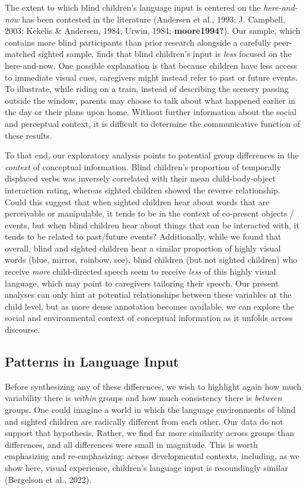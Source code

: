 \documentclass[
  man,floatsintext]{apa6}
\begin{document}
The extent to which blind children's language input is centered on the \emph{here-and-now} has been contested in the literature (Andersen et al., 1993; J. Campbell, 2003; Kekelis \& Andersen, 1984; Urwin, 1984; \textbf{moore1994?}). Our sample, which contains more blind participants than prior research alongside a carefully peer-matched sighted sample, finds that blind children's input is \emph{less} focused on the here-and-now. One possible explanation is that because children have less access to immediate visual cues, caregivers might instead refer to past or future events. To illustrate, while riding on a train, instead of describing the scenery passing outside the window, parents may choose to talk about what happened earlier in the day or their plans upon home. Without further information about the social and perceptual context, it is difficult to determine the communicative function of these results.

To that end, our exploratory analysis points to potential group differences in the \emph{context} of conceptual information. Blind children's proportion of temporally displaced verbs was inversely correlated with their mean child-body-object interaction rating, whereas sighted children showed the reverse relationship. Could this suggest that when sighted children hear about words that are perceivable or manipulable, it tends to be in the context of co-present objects / events, but when blind children hear about things that can be interacted with, it tends to be related to past/future events? Additionally, while we found that overall, blind and sighted children hear a similar proportion of highly visual words (blue, mirror, rainbow, see), blind children (but not sighted children) who receive \emph{more} child-directed speech seem to receive \emph{less} of this highly visual language, which may point to caregivers tailoring their speech. Our present analyses can only hint at potential relationships between these variables at the child level, but as more dense annotation becomes available, we can explore the social and environmental context of conceptual information as it unfolds across discourse.

\hypertarget{patterns-in-language-input}{%
\subsection{Patterns in Language Input}\label{patterns-in-language-input}}

Before synthesizing any of these differences, we wish to highlight again how much variability there is \emph{within} groups and how much consistency there is \emph{between} groups. One could imagine a world in which the language environments of blind and sighted children are radically different from each other. Our data do not support that hypothesis. Rather, we find far more similarity across groups than differences, and all differences were small in magnitude. This is worth emphasizing and re-emphasizing: across developmental contexts, including, as we show here, visual experience, children's language input is resoundingly similar (Bergelson et al., 2022).
\end{document}
